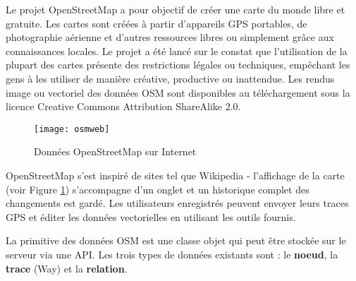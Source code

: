 
Le projet OpenStreetMap a pour objectif de créer une carte du monde libre et gratuite. Les cartes sont créées à partir d'appareils GPS portables, de photographie aérienne et d'autres ressources libres ou simplement grâce aux connaissances locales. Le projet a été lancé sur le constat que l'utilisation de la plupart des cartes présente des restrictions légales ou techniques, empêchant les gens à les utiliser de manière créative, productive ou inattendue. Les rendus image ou vectoriel des données OSM sont disponibles au téléchargement sous la licence Creative Commons Attribution ShareAlike 2.0.

\begin{figure}[ht]
   \begin{center}
   \caption{Données OpenStreetMap sur Internet \nixcaption}\label{fig:osmweb}\smallskip
   \texttt{[image: osmweb]}
\end{center}
\end{figure}

OpenStreetMap s'est inspiré de sites tel que Wikipedia - l'affichage de la carte (voir Figure \ref{fig:osmweb}) s'accompagne d'un onglet  et un historique complet des changements est gardé. Les utilisateurs enregistrés peuvent envoyer leurs traces GPS et éditer les données vectorielles en utilisant les outils fournis.

La primitive des données OSM est une classe objet qui peut être stockée sur le serveur via une API. Les trois types de données existants sont : le \textbf{noeud}, la \textbf{trace} (Way) et la \textbf{relation}.

